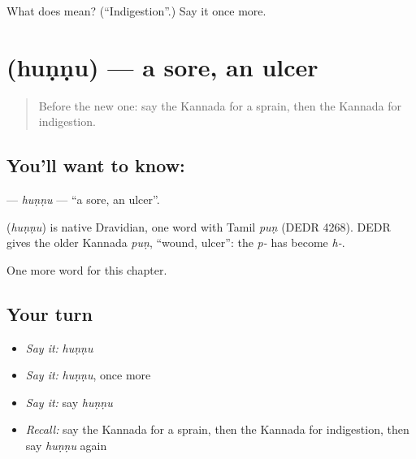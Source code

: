 \begin{tcolorbox}[breakable,colback=teal!4,colframe=teal!35!black,title={Before you move on}]
What does  mean? (\textquotedblleft{}Indigestion\textquotedblright{}.) Say it once more.
\end{tcolorbox}
\section[\texorpdfstring{\kn{ಹುಣ್ಣು} (huṇṇu)}{ಹುಣ್ಣು (huṇṇu)}]{ (huṇṇu) — a sore, an ulcer}

\label{lesson:KA-C246-hunnu}



\begin{quote}
Before the new one: say the Kannada for a sprain, then the Kannada for indigestion.
\end{quote}

\subsection*{You'll want to know: }
\textbf{} — \emph{huṇṇu} — \textquotedblleft{}a sore, an ulcer\textquotedblright{}.

\begin{cousinweb}
\textbf{} (\emph{huṇṇu}) is native Dravidian, one word with Tamil \emph{puṇ} (DEDR 4268). DEDR gives the older Kannada \emph{puṇ}, \textquotedblleft{}wound, ulcer\textquotedblright{}: the \emph{p-} has become \emph{h-}.
\end{cousinweb}

\begin{grammarlens}[title={What you've built}]
One more word for this chapter.
\end{grammarlens}

\subsection*{Your turn}
\begin{itemize}
\raggedright
  \item \emph{Say it:} \emph{huṇṇu}
  \item \emph{Say it:} \emph{huṇṇu}, once more
  \item \emph{Say it:} say \emph{huṇṇu}
  \item \emph{Recall:} say the Kannada for a sprain, then the Kannada for indigestion, then say \emph{huṇṇu} again
\end{itemize}

